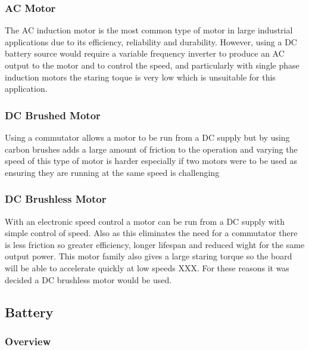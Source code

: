 \documentclass[journal,10pt]{IEEEtran}
\begin{document}
        \subsubsection{AC Motor}
        The AC induction motor is the most common type of motor in large industrial applications due to its efficiency, reliability and durability. However, using a DC battery source would require a variable frequency inverter to produce an AC output to the motor and to control the speed, and particularly with single phase induction motors the staring toque is very low which is unsuitable for this application. 
        \subsubsection{DC Brushed Motor}
        Using a commutator allows a motor to be run from a DC supply but by using carbon brushes adds a large amount of friction to the operation and varying the speed of this type of motor is harder especially if two motors were to be used as ensuring they are running at the same speed is challenging
        \subsubsection{DC Brushless Motor}
        With an electronic speed control a motor can be run from a DC supply with simple control of speed. Also as this eliminates the need for a commutator there is less friction so greater efficiency, longer lifespan and reduced wight for the same output power. This motor family also gives a large staring torque so the board will be able to accelerate quickly at low speeds XXX. For these reasons it was decided a DC brushless motor would be used.
    \subsection{Battery}
        \subsubsection{Overview}
\end{document}
